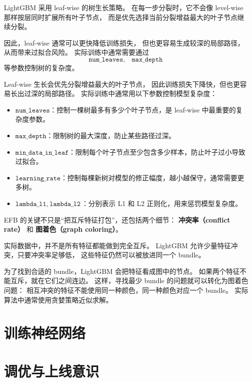 \begin{theorem}
LightGBM 采用 leaf-wise 的树生长策略。
在每一步分裂时，它不会像 level-wise 那样按层同时扩展所有叶子节点，
而是优先选择当前分裂增益最大的叶子节点继续分裂。

因此，leaf-wise 通常可以更快降低训练损失，
但也更容易生成较深的局部路径，从而带来过拟合风险。
实际训练中通常需要通过
\[
\texttt{num\_leaves},\quad \texttt{max\_depth}
\]
等参数控制树的复杂度。
\end{theorem}
\begin{note}
Leaf-wise 生长会优先分裂增益最大的叶子节点，
因此训练损失下降快，但也更容易长出过深的局部路径。
实际训练中通常用以下参数控制模型复杂度：
\begin{itemize}
    \item $\texttt{num\_leaves}$：控制一棵树最多有多少个叶子节点，是 leaf-wise 中最重要的复杂度参数。
    \item $\texttt{max\_depth}$：限制树的最大深度，防止某些路径过深。
    \item $\texttt{min\_data\_in\_leaf}$：限制每个叶子节点至少包含多少样本，防止叶子过小导致过拟合。
    \item $\texttt{learning\_rate}$：控制每棵新树对模型的修正幅度，越小越保守，通常需要更多树。
    \item $\texttt{lambda\_l1},\ \texttt{lambda\_l2}$：分别表示 L1 和 L2 正则化，用来惩罚模型复杂度。
\end{itemize}
\end{note}
\begin{dxtips}
EFB 的关键不只是“把互斥特征打包”，还包括两个细节：
\textbf{冲突率（conflict rate）} 和 \textbf{图着色（graph coloring）}。

实际数据中，并不是所有特征都能做到完全互斥。
LightGBM 允许少量特征冲突，只要冲突率足够低，
这些特征仍然可以被放进同一个 bundle。

为了找到合适的 bundle，LightGBM 会把特征看成图中的节点。
如果两个特征不能互斥，就在它们之间连边。
这样，寻找最少 bundle 的问题就可以转化为图着色问题：
相互冲突的特征不能使用同一种颜色，同一种颜色对应一个 bundle。
实际算法中通常使用贪婪策略近似求解。
\end{dxtips}
\chapter{训练神经网络}
\chapter{调优与上线意识}